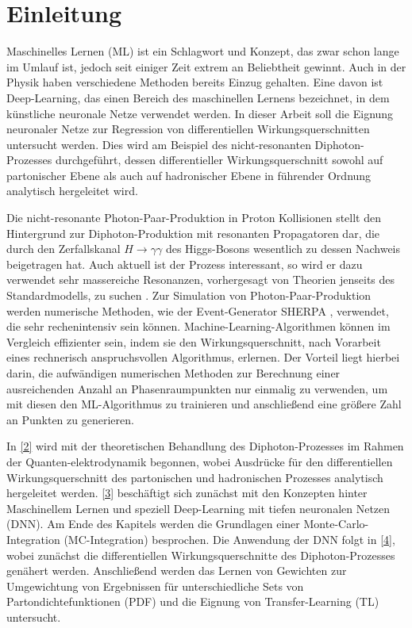 

\cleardoublepage
\tableofcontents
\cleardoublepage




\chapter{Einleitung}
Maschinelles Lernen (ML) ist ein Schlagwort und Konzept, das zwar schon lange im Umlauf ist, jedoch seit einiger Zeit extrem an Beliebtheit gewinnt. Auch in der Physik haben verschiedene Methoden bereits Einzug gehalten. Eine davon ist Deep-Learning, das einen Bereich des maschinellen Lernens bezeichnet, in dem künstliche neuronale Netze verwendet werden. In dieser Arbeit soll die Eignung neuronaler Netze zur Regression von differentiellen Wirkungsquerschnitten untersucht werden. Dies wird am Beispiel des nicht-resonanten Diphoton-Prozesses durchgeführt, dessen differentieller Wirkungsquerschnitt sowohl auf partonischer Ebene als auch auf hadronischer Ebene in führender Ordnung analytisch hergeleitet wird.

Die nicht-resonante Photon-Paar-Produktion in Proton Kollisionen stellt den Hintergrund zur Diphoton-Produktion mit resonanten Propagatoren dar, die durch den  Zerfallskanal $H \rightarrow \gamma \gamma$ des Higgs-Bosons wesentlich zu dessen Nachweis  \cite{Higgs-Disco, Higgs-Dicso-CMS} beigetragen hat. Auch aktuell ist der Prozess interessant, so wird er dazu verwendet sehr massereiche Resonanzen, vorhergesagt von Theorien jenseits des Standardmodells, zu suchen \cite{diphoton-aktuell}. Zur Simulation von Photon-Paar-Produktion werden numerische Methoden, wie der Event-Generator SHERPA \cite{SHERPA}, verwendet, die sehr rechenintensiv sein können. Machine-Learning-Algorithmen können im Vergleich effizienter sein, indem sie den Wirkungsquerschnitt, nach Vorarbeit eines rechnerisch anspruchsvollen Algorithmus, erlernen. Der Vorteil liegt hierbei darin, die aufwändigen numerischen Methoden zur Berechnung einer ausreichenden Anzahl an Phasenraumpunkten nur einmalig zu verwenden, um mit diesen den ML-Algorithmus zu trainieren und anschließend eine größere Zahl an Punkten zu generieren.

In \textsf{\autoref{2}} wird mit der theoretischen Behandlung des Diphoton-Prozesses im Rahmen der Quanten-elektrodynamik begonnen, wobei Ausdrücke für den differentiellen Wirkungsquerschnitt des partonischen und hadronischen Prozesses analytisch hergeleitet werden. \textsf{\autoref{3}} beschäftigt sich zunächst mit den Konzepten hinter Maschinellem Lernen und speziell Deep-Learning mit tiefen neuronalen Netzen (DNN). Am Ende des Kapitels werden die Grundlagen einer Monte-Carlo-Integration (MC-Integration) besprochen. Die Anwendung der DNN folgt in \textsf{\autoref{4}}, wobei zunächst die differentiellen Wirkungsquerschnitte des Diphoton-Prozesses genähert werden. Anschließend werden das Lernen von Gewichten zur Umgewichtung von Ergebnissen für unterschiedliche Sets von Partondichtefunktionen (PDF) und die Eignung von Transfer-Learning (TL) untersucht. 

